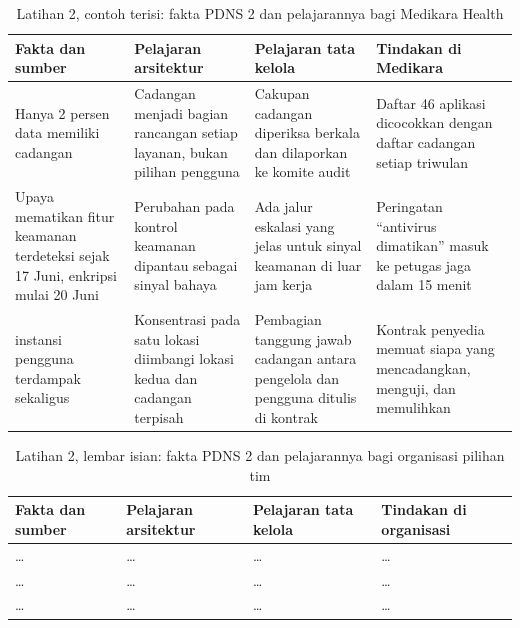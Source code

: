 \begin{table}[!htb]
  \centering
  \caption{Latihan 2, contoh terisi: fakta PDNS 2 dan pelajarannya bagi Medikara Health}
  \label{tab:ch12-lat2-contoh}
  \footnotesize
  \begin{tabularx}{\textwidth}{>{\raggedright\arraybackslash}p{2.6cm} >{\raggedright\arraybackslash}X >{\raggedright\arraybackslash}X >{\raggedright\arraybackslash}X}
    \hline
    \textbf{Fakta dan sumber} & \textbf{Pelajaran arsitektur} & \textbf{Pelajaran tata kelola} &
      \textbf{Tindakan di Medikara} \\ \hline
    Hanya 2 persen data memiliki cadangan \cite{c12-cnbc2024} & Cadangan menjadi bagian rancangan
      setiap layanan, bukan pilihan pengguna & Cakupan cadangan diperiksa berkala dan dilaporkan
      ke komite audit & Daftar 46 aplikasi dicocokkan dengan daftar cadangan setiap triwulan \\
      \hline
    Upaya mematikan fitur keamanan terdeteksi sejak 17 Juni, enkripsi mulai 20 Juni
      \cite{c12-antara2024} & Perubahan pada kontrol keamanan dipantau sebagai sinyal bahaya &
      Ada jalur eskalasi yang jelas untuk sinyal keamanan di luar jam kerja & Peringatan
      ``antivirus dimatikan'' masuk ke petugas jaga dalam 15 menit \\ \hline
    282 instansi pengguna terdampak sekaligus \cite{c12-cnn2024} & Konsentrasi pada satu lokasi
      diimbangi lokasi kedua dan cadangan terpisah & Pembagian tanggung jawab cadangan antara
      pengelola dan pengguna ditulis di kontrak & Kontrak penyedia memuat siapa yang mencadangkan,
      menguji, dan memulihkan \\ \hline
  \end{tabularx}
\end{table}

\begin{table}[!htb]
  \centering
  \caption{Latihan 2, lembar isian: fakta PDNS 2 dan pelajarannya bagi organisasi pilihan tim}
  \label{tab:ch12-lat2-hasil}
  \footnotesize
  \begin{tabularx}{\textwidth}{>{\raggedright\arraybackslash}p{2.6cm} >{\raggedright\arraybackslash}X >{\raggedright\arraybackslash}X >{\raggedright\arraybackslash}X}
    \hline
    \textbf{Fakta dan sumber} & \textbf{Pelajaran arsitektur} & \textbf{Pelajaran tata kelola} &
      \textbf{Tindakan di organisasi} \\ \hline
    \dots & \dots & \dots & \dots \\ \hline
    \dots & \dots & \dots & \dots \\ \hline
    \dots & \dots & \dots & \dots \\ \hline
  \end{tabularx}
\end{table}

